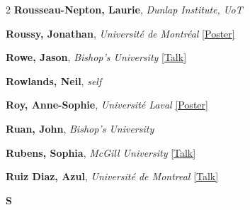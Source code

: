 \begin{small}
\begin{multicols}{2}
\textbf{Rousseau-Nepton, Laurie}, {\footnotesize\textit{Dunlap Institute, UoT}}\par
\textbf{Roussy, Jonathan}, {\footnotesize\textit{Université de Montréal}} \hyperref[poster-abstract-page-talk-240]{\scriptsize\textcolor{cascateal}{[Poster]}}\par
\textbf{Rowe, Jason}, {\footnotesize\textit{Bishop's University}} \hyperref[abstract-page-talk-228]{\scriptsize\textcolor{cascablue}{[Talk]}}\par
\textbf{Rowlands, Neil}, {\footnotesize\textit{self}}\par
\textbf{Roy, Anne-Sophie}, {\footnotesize\textit{Université Laval}} \hyperref[poster-abstract-page-talk-72]{\scriptsize\textcolor{cascateal}{[Poster]}}\par
\textbf{Ruan, John}, {\footnotesize\textit{Bishop's University}}\par
\textbf{Rubens, Sophia}, {\footnotesize\textit{McGill University}} \hyperref[abstract-page-talk-43]{\scriptsize\textcolor{cascablue}{[Talk]}}\par
\textbf{Ruiz Diaz, Azul}, {\footnotesize\textit{Université de Montreal}} \hyperref[abstract-page-talk-8]{\scriptsize\textcolor{cascablue}{[Talk]}}\par

{\sffamily\bfseries\color{cascablue}\large S}\\[2pt]


\end{multicols}
\end{small}
